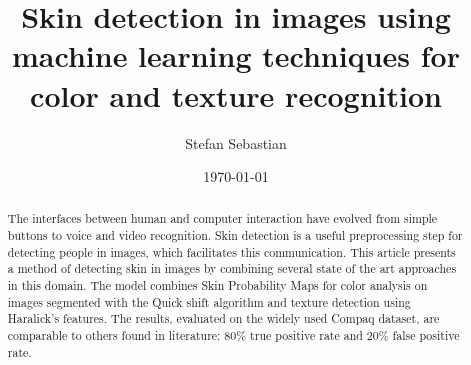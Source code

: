 \documentclass[12pt]{article}
\begin{document}
	\title{Skin detection in images using machine learning techniques for color and texture recognition}
	\author{Stefan Sebastian}
	\date{\today}
	\maketitle
	
	\begin{abstract}
		The interfaces between human and computer interaction have evolved from simple buttons to voice and video recognition. Skin detection is a useful preprocessing step for detecting people in images, which facilitates this communication. This article presents a method of detecting skin in images by combining several state of the art approaches in this domain. The model combines Skin Probability Maps for color analysis on images segmented with the Quick shift algorithm and texture detection using Haralick's features. The results, evaluated on the widely used Compaq dataset, are comparable to others found in literature: 80\% true positive rate and 20\% false positive rate.
	\end{abstract}
	
	\newpage
	\tableofcontents
	\newpage
	
	
	
	
	
	\newpage
	
	
\end{document}
